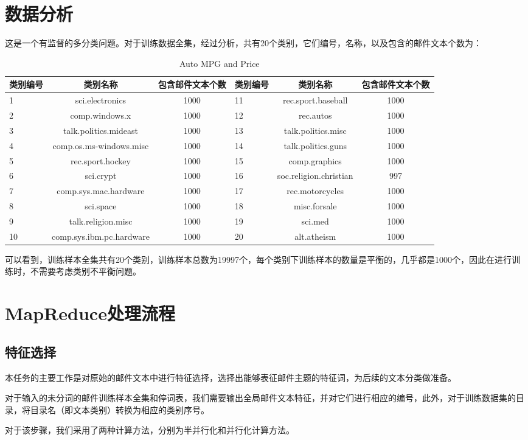 \documentclass[lang=cn,11pt]{elegantpaper}
\begin{document}
\begin{lstlisting}

\end{lstlisting}

\section{数据分析}
这是一个有监督的多分类问题。对于训练数据全集，经过分析，共有20个类别，它们编号，名称，以及包含的邮件文本个数为：\par
\begin{table}[htbp]
  \small
  \centering
  \caption{Auto MPG and Price \label{tab:reg}}
    \begin{tabular}{lcc|lcc}
    \toprule
    类别编号  &   类别名称  &   包含邮件文本个数  &   类别编号  & 类别名称  & 包含邮件文本个数  \\
    \hline
    1 & sci.electronics & 1000            & 11 & rec.sport.baseball & 1000 \\
    2 & comp.windows.x & 1000             & 12 & rec.autos & 1000 \\
    3 & talk.politics.mideast & 1000      & 13 & talk.politics.misc & 1000 \\
    4 & comp.os.ms-windows.misc & 1000    & 14 & talk.politics.guns & 1000 \\
    5 & rec.sport.hockey & 1000           & 15 & comp.graphics & 1000 \\
    6 & sci.crypt & 1000                  & 16 & soc.religion.christian & 997 \\
    7 & comp.sys.mac.hardware & 1000      & 17 & rec.motorcycles & 1000 \\
    8 & sci.space & 1000                  & 18 & misc.forsale & 1000 \\
    9 & talk.religion.misc & 1000         & 19 & sci.med & 1000 \\
    10 & comp.sys.ibm.pc.hardware & 1000  & 20 & alt.atheism & 1000 \\
    \bottomrule
    \end{tabular}%
\end{table}%
可以看到，训练样本全集共有20个类别，训练样本总数为19997个，每个类别下训练样本的数量是平衡的，几乎都是1000个，因此在进行训练时，不需要考虑类别不平衡问题。


\section{MapReduce处理流程}
\subsection{特征选择}
本任务的主要工作是对原始的邮件文本中进行特征选择，选择出能够表征邮件主题的特征词，为后续的文本分类做准备。\par
对于输入的未分词的邮件训练样本全集和停词表，我们需要输出全局邮件文本特征，并对它们进行相应的编号，此外，对于训练数据集的目录，将目录名（即文本类别）转换为相应的类别序号。\par
对于该步骤，我们采用了两种计算方法，分别为半并行化和并行化计算方法。
\end{document}

